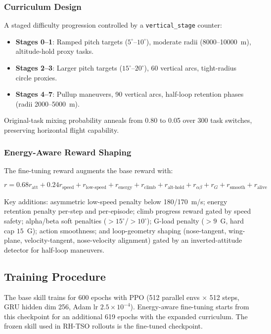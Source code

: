 \documentclass{article}
\begin{document}
\subsubsection{Curriculum Design}

A staged difficulty progression controlled by a \texttt{vertical\_stage} counter:

\begin{itemize}
  \item \textbf{Stages 0--1}: Ramped pitch targets ($5^\circ$--$10^\circ$), moderate radii (8000--10000~m), altitude-hold proxy tasks.
  \item \textbf{Stages 2--3}: Larger pitch targets ($15^\circ$--$20^\circ$), 60\textdegree{} vertical arcs, tight-radius circle proxies.
  \item \textbf{Stages 4--7}: Pullup maneuvers, 90\textdegree{} vertical arcs, half-loop retention phases (radii 2000--5000~m).
\end{itemize}

Original-task mixing probability anneals from 0.80 to 0.05 over 300 task switches, preserving horizontal flight capability.

\subsubsection{Energy-Aware Reward Shaping}

The fine-tuning reward augments the base reward with:

\begin{equation}
  r = 0.68 r_{\text{att}} + 0.24 r_{\text{speed}} + r_{\text{low-speed}} + r_{\text{energy}} + r_{\text{climb}} + r_{\text{alt-hold}} + r_{\alpha\beta} + r_{G} + r_{\text{smooth}} + r_{\text{alive}}
\end{equation}

Key additions: asymmetric low-speed penalty below 180/170~m/s; energy retention penalty per-step and per-episode; climb progress reward gated by speed safety; alpha/beta soft penalties ($>15^\circ$/$>10^\circ$); G-load penalty ($>9$~G, hard cap $15$~G); action smoothness; and loop-geometry shaping (nose-tangent, wing-plane, velocity-tangent, nose-velocity alignment) gated by an inverted-attitude detector for half-loop maneuvers.

\subsection{Training Procedure}

The base skill trains for 600 epochs with PPO (512 parallel envs $\times$ 512 steps, GRU hidden dim 256, Adam lr $2.5\times10^{-4}$).
Energy-aware fine-tuning starts from this checkpoint for an additional 619 epochs with the expanded curriculum.
The frozen skill used in RH-TSO rollouts is the fine-tuned checkpoint.
\end{document}
